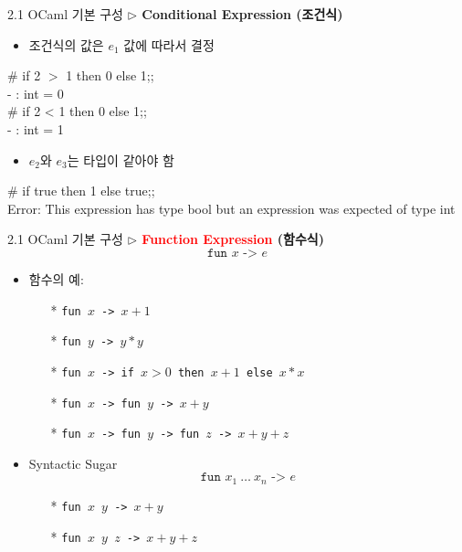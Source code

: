 \documentclass[10pt]{beamer}
\begin{document}
	\begin{frame}{2.1 OCaml 기본 구성}
		\textbf{$\triangleright$ Conditional Expression (조건식)}
		\begin{itemize}
			\item 조건식의 값은 $e_1$ 값에 따라서 결정
		\end{itemize}
		\begin{tcolorbox}[colback=backcolor]\ttfamily
			\# if 2 $>$ 1 then 0 else 1;;\\
			- : int = 0 \\
			\# if 2 < 1 then 0 else 1;; \\
			- : int = 1
		\end{tcolorbox}
		\begin{itemize}
			\item $e_2$와 $e_3$는 타입이 같아야 함
		\end{itemize}
		\begin{tcolorbox}[colback=backcolor]\ttfamily
			\# if true then 1 else true;;\\
			Error: This expression has type bool but an expression was expected of type
			int
		\end{tcolorbox}
		\begin{itemize}
			\item[]
		\end{itemize}
	\end{frame}

	\begin{frame}{2.1 OCaml 기본 구성}
		\textbf{$\triangleright$ \textcolor{red}{Function Expression} (함수식)}
		\[
		\texttt{fun $x$ -> $e$}
		\] 
		\begin{itemize}
			\item 함수의 예:
			\begin{itemize}
				\item[*] \texttt{fun $x$ -> $x+1$}
				\item[*] \texttt{fun $y$ -> $y*y$}
				\item[*] \texttt{fun $x$ -> if $x>0$ then $x+1$ else $x*x$}
				\item[*] \texttt{fun $x$ -> fun $y$ -> $x+y$}
				\item[*] \texttt{fun $x$ -> fun $y$ -> fun $z$ -> $x+y+z$}
			\end{itemize}
			\item[]
			\item Syntactic Sugar \[
			\texttt{fun $x_1\ \dots\ x_n$\ ->\ $e$}
			\]
			\begin{itemize}
				\item[*] \texttt{fun $x$ $y$ -> $x+y$}
				\item[*] \texttt{fun $x$ $y$ $z$ -> $x+y+z$}
			\end{itemize}
		\end{itemize}
	\end{frame}
\end{document}
